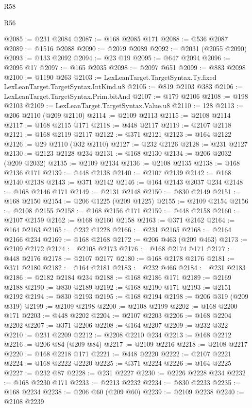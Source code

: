 \begin{lexlean}{R58}
\begin{lexlean}{R56}
\begin{coremodule}
{{{{{{{{{{{{{{{{{{{{{{{{{{{{{{{{{{{{{{{{{{{{{{{{{{{{{{{{{{{{{{{{{{{{{{{{{{{{{{{{{{{{{{{{{{{{{{{{{{{{{{{{{{{{{{{{{{{{{{{{{{{{{{{{{{{{{{{{{{{{{{{{{{{{{{{{{{{{{{{{{{{{{{{{{{{{{{{{{{{{{{{{{{{{{{{{{{{{{{{{{{{{{{{{{{{@2085 := @231 @2084
@2087 := @168 @2085 @171
@2088 := @536 @2087
@2089 := @1516 @2088
@2090 := @2079 @2089
@2092 := @2031 (@2055 @2090)
@2093 := @133 @2092
@2094 := @23 @19
@2095 := @647 @2094
@2096 := @2095 @17
@2097 := @165 @2035
@2098 := @2097 @651
@2099 := @883 @2098
@2100 := @1190 @263
@2103 := LexLeanTarget.TargetSyntax.Ty.fixed LexLeanTarget.TargetSyntax.IntKind.u8
@2105 := @819 @2103 @383
@2106 := LexLeanTarget.TargetSyntax.Prim.bitAnd
@2107 := @179 @2106
@2108 := @198 @2103
@2109 := LexLeanTarget.TargetSyntax.Value.u8
@2110 := 128
@2113 := @206 @2110 (@209 @2110)
@2114 := @2109 @2113
@2115 := @2108 @2114
@2117 := @168 @2115 @171
@2118 := @448 @2117
@2119 := @2107 @2118
@2121 := @168 @2119 @2117
@2122 := @371 @2121
@2123 := @164 @2122
@2126 := @29 @2110 (@32 @2110)
@2127 := @232 @2126
@2128 := @231 @2127
@2130 := @2123 @2128 @234
@2131 := @168 @2130
@2134 := @206 @2032 (@209 @2032)
@2135 := @2109 @2134
@2136 := @2108 @2135
@2138 := @168 @2136 @171
@2139 := @448 @2138
@2140 := @2107 @2139
@2142 := @168 @2140 @2138
@2143 := @371 @2142
@2146 := @164 @2143 @2037 @234
@2148 := @168 @2146 @171
@2149 := @2131 @2148
@2150 := @830 @2149
@2151 := @168 @2150
@2154 := @206 @1225 (@209 @1225)
@2155 := @2109 @2154
@2156 := @2108 @2155
@2158 := @168 @2156 @171
@2159 := @448 @2158
@2160 := @2107 @2159
@2162 := @168 @2160 @2158
@2163 := @371 @2162
@2164 := @164 @2163
@2165 := @232 @1228
@2166 := @231 @2165
@2168 := @2164 @2166 @234
@2169 := @168 @2168
@2172 := @206 @463 (@209 @463)
@2173 := @2109 @2172
@2174 := @2108 @2173
@2176 := @168 @2174 @171
@2177 := @448 @2176
@2178 := @2107 @2177
@2180 := @168 @2178 @2176
@2181 := @371 @2180
@2182 := @164 @2181
@2183 := @232 @466
@2184 := @231 @2183
@2186 := @2182 @2184 @234
@2188 := @168 @2186 @171
@2189 := @2169 @2188
@2190 := @830 @2189
@2192 := @168 @2190 @171
@2193 := @2151 @2192
@2194 := @830 @2193
@2195 := @168 @2194
@2198 := @206 @319 (@209 @319)
@2199 := @2109 @2198
@2200 := @2108 @2199
@2202 := @168 @2200 @171
@2203 := @448 @2202
@2204 := @2107 @2203
@2206 := @168 @2204 @2202
@2207 := @371 @2206
@2208 := @164 @2207
@2209 := @232 @322
@2210 := @231 @2209
@2212 := @2208 @2210 @234
@2213 := @168 @2212
@2216 := @206 @84 (@209 @84)
@2217 := @2109 @2216
@2218 := @2108 @2217
@2220 := @168 @2218 @171
@2221 := @448 @2220
@2222 := @2107 @2221
@2224 := @168 @2222 @2220
@2225 := @371 @2224
@2226 := @164 @2225
@2227 := @232 @87
@2228 := @231 @2227
@2230 := @2226 @2228 @234
@2232 := @168 @2230 @171
@2233 := @2213 @2232
@2234 := @830 @2233
@2235 := @168 @2234
@2238 := @206 @60 (@209 @60)
@2239 := @2109 @2238
@2240 := @2108 @2239
}}}}}}}}}}}}}}}}}}}}}}}}}}}}}}}}}}}}}}}}}}}}}}}}}}}}}}}}}}}}}}}}}}}}}}}}}}}}}}}}}}}}}}}}}}}}}}}}}}}}}}}}}}}}}}}}}}}}}}}}}}}}}}}}}}}}}}}}}}}}}}}}}}}}}}}}}}}}}}}}}}}}}}}}}}}}}}}}}}}}}}}}}}}}}}}}}}}}}}}}}}}}}}}}}}}
\end{coremodule}
\end{lexlean}
\end{lexlean}
